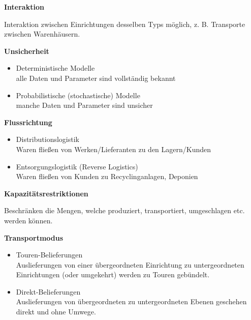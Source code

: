     \par \textbf{Interaktion}
    \par Interaktion zwischen Einrichtungen desselben Typs möglich, z. B. Transporte zwischen Warenhäusern.

    \par \textbf{Unsicherheit}
    \begin{itemize}
      \item Deterministische Modelle\\
      alle Daten und Parameter sind vollständig bekannt
      \item Probabilistische (stochastische) Modelle\\
      manche Daten und Parameter sind unsicher
    \end{itemize}

    \par \textbf{Flussrichtung}
    \begin{itemize}
      \item Distributionslogistik\\
      Waren fließen von Werken/Lieferanten zu den Lagern/Kunden
      \item Entsorgungslogistik (Reverse Logistics)\\
      Waren fließen von Kunden zu Recyclinganlagen, Deponien
    \end{itemize}

    \par \textbf{Kapazitätsrestriktionen}
    \par Beschränken die Mengen, welche produziert, transportiert, umgeschlagen etc. werden können.

    \par \textbf{Transportmodus}
    \begin{itemize}
      \item Touren-Belieferungen\\ 
      Auslieferungen von einer übergeordneten Einrichtung zu untergeordneten Einrichtungen (oder umgekehrt) werden zu Touren gebündelt.
      \item Direkt-Belieferungen\\ 
      Auslieferungen von übergeordneten zu untergeordneten Ebenen geschehen direkt und ohne Umwege.
    \end{itemize}
    
    \par \textbf{}


  

